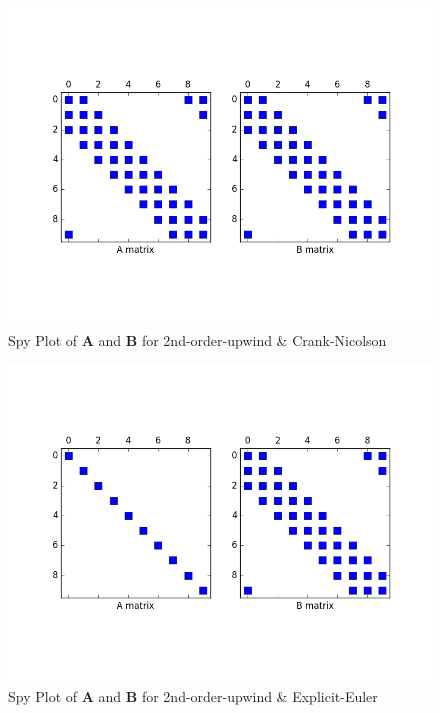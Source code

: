 \documentclass[12pt]{article}
\newenvironment{problem}[2][Problem]{\begin{trivlist}
\item[\hskip \labelsep {\bfseries #1}\hskip \labelsep {\bfseries #2.}]}{\end{trivlist}}
\begin{document}
\begin{problem}{2}
\begin{figure}[H]
\label{label}
\end{figure}
\begin{figure}[H]
\centering
  \includegraphics[scale=0.5]{p2d_u2nd_cn.png}
 \caption{Spy Plot of $\mathbf{A}$ and $\mathbf{B}$ for 2nd-order-upwind \& Crank-Nicolson}
\label{label}
\end{figure}
\begin{figure}[H]
\centering
  \includegraphics[scale=0.5]{p2d_u2nd_ee.png}
 \caption{Spy Plot of $\mathbf{A}$ and $\mathbf{B}$ for 2nd-order-upwind \& Explicit-Euler}
\label{label}
\end{figure}
\begin{figure}[H]
\centering

\end{figure}
\end{problem}
\end{document}

